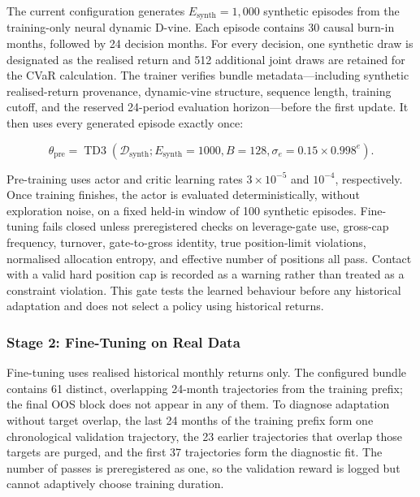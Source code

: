 The current configuration generates $E_{\mathrm{synth}}=1{,}000$ synthetic episodes from the training-only neural dynamic D-vine. Each episode contains 30 causal burn-in months, followed by 24 decision months. For every decision, one synthetic draw is designated as the realised return and 512 additional joint draws are retained for the CVaR calculation. The trainer verifies bundle metadata---including synthetic realised-return provenance, dynamic-vine structure, sequence length, training cutoff, and the reserved 24-period evaluation horizon---before the first update. It then uses every generated episode exactly once:

\begin{equation}
\theta_{\mathrm{pre}}=\operatorname{TD3}\!\left(\mathcal{D}_{\mathrm{synth}};E_{\mathrm{synth}}=1000,B=128,\sigma_e=0.15\times0.998^e\right).
\label{eq:pretrain_objective}
\end{equation}

Pre-training uses actor and critic learning rates $3\times10^{-5}$ and $10^{-4}$, respectively. Once training finishes, the actor is evaluated deterministically, without exploration noise, on a fixed held-in window of 100 synthetic episodes. Fine-tuning fails closed unless preregistered checks on leverage-gate use, gross-cap frequency, turnover, gate-to-gross identity, true position-limit violations, normalised allocation entropy, and effective number of positions all pass. Contact with a valid hard position cap is recorded as a warning rather than treated as a constraint violation. This gate tests the learned behaviour before any historical adaptation and does not select a policy using historical returns.

\subsubsection{Stage 2: Fine-Tuning on Real Data}
\label{subsubsec:3_stage2_training}

Fine-tuning uses realised historical monthly returns only. The configured bundle contains 61 distinct, overlapping 24-month trajectories from the training prefix; the final OOS block does not appear in any of them. To diagnose adaptation without target overlap, the last 24 months of the training prefix form one chronological validation trajectory, the 23 earlier trajectories that overlap those targets are purged, and the first 37 trajectories form the diagnostic fit. The number of passes is preregistered as one, so the validation reward is logged but cannot adaptively choose training duration.

